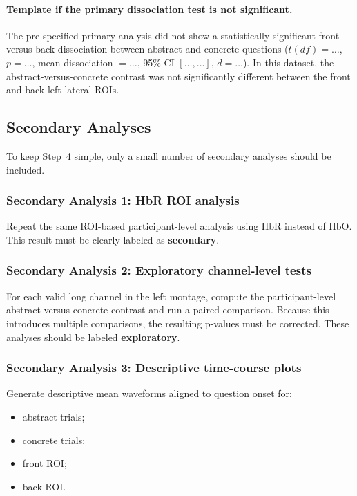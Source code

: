 \documentclass[11pt]{article}
\begin{document}
\paragraph{Template if the primary dissociation test is not significant.}
The pre-specified primary analysis did not show a statistically significant front-versus-back dissociation
between abstract and concrete questions
(\(t(df)=\ldots\), \(p=\ldots\), mean dissociation \(=\ldots\), 95\% CI \([\ldots,\ldots]\), \(d=\ldots\)).
In this dataset, the abstract-versus-concrete contrast was not significantly different between the
front and back left-lateral ROIs.

\subsection{Secondary Analyses}
To keep Step~4 simple, only a small number of secondary analyses should be included.

\subsubsection{Secondary Analysis 1: HbR ROI analysis}
Repeat the same ROI-based participant-level analysis using HbR instead of HbO.
This result must be clearly labeled as \textbf{secondary}.

\subsubsection{Secondary Analysis 2: Exploratory channel-level tests}
For each valid long channel in the left montage, compute the participant-level abstract-versus-concrete
contrast and run a paired comparison.
Because this introduces multiple comparisons, the resulting p-values must be corrected.
These analyses should be labeled \textbf{exploratory}.

\subsubsection{Secondary Analysis 3: Descriptive time-course plots}
Generate descriptive mean waveforms aligned to question onset for:
\begin{itemize}
    \item abstract trials;
    \item concrete trials;
    \item front ROI;
    \item back ROI.
\end{itemize}
\end{document}
